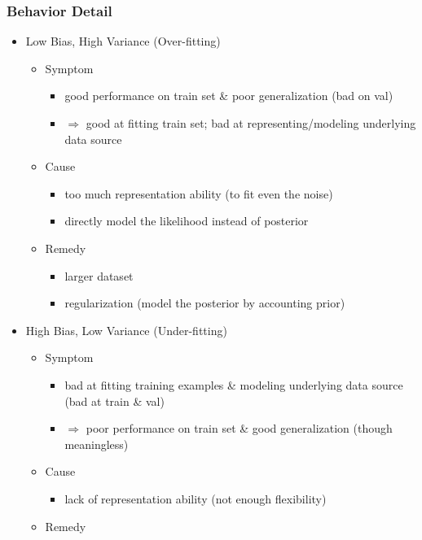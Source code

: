 \subsubsection{Behavior Detail}
\begin{itemize}
\item Low Bias, High Variance (Over-fitting)
	\begin{itemize}
	\item Symptom
		\begin{itemize}
		\item good performance on train set \& poor generalization (bad on val) \\
		\item $\Rightarrow$ good at fitting train set; bad at representing/modeling underlying data source
		\end{itemize}
	\item Cause
		\begin{itemize}
		\item too much representation ability (to fit even the noise)
		\item directly model the likelihood instead of posterior
		\end{itemize}
	\item Remedy
		\begin{itemize}
		\item larger dataset
		\item regularization (model the posterior by accounting prior)
		\end{itemize}
	\end{itemize}
\item High Bias, Low Variance (Under-fitting)
	\begin{itemize}
	\item Symptom
		\begin{itemize}
		\item bad at fitting training examples \& modeling underlying data source \\ 
		(bad at train \& val)
		\item $\Rightarrow$ poor performance on train set \& good generalization (though meaningless)
		\end{itemize}
	\item Cause
		\begin{itemize}
		\item lack of representation ability (not enough flexibility)
		\end{itemize}
	\item Remedy
		\begin{itemize}

\end{itemize}
\end{itemize}
\end{itemize}
